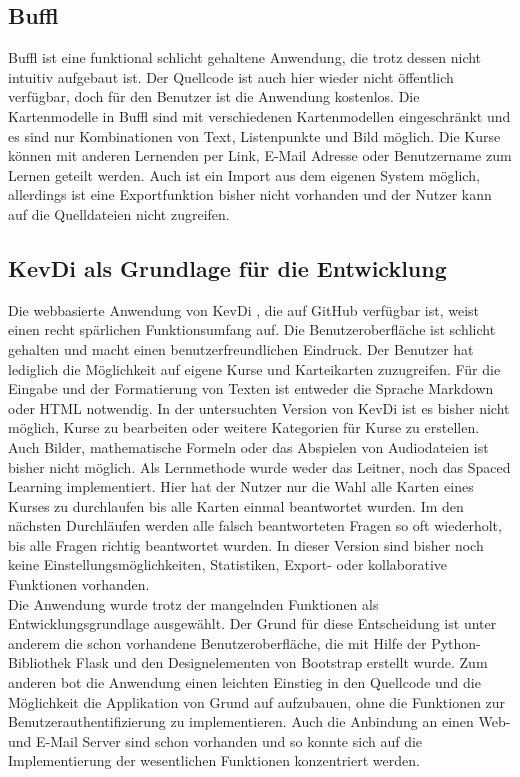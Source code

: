 \subsection{Buffl}
Buffl \cite{buffl} ist eine funktional schlicht gehaltene Anwendung, die trotz dessen nicht intuitiv aufgebaut ist. Der Quellcode ist auch hier wieder nicht öffentlich verfügbar, doch für den Benutzer ist die Anwendung kostenlos. Die Kartenmodelle in Buffl sind mit verschiedenen Kartenmodellen eingeschränkt und es sind nur Kombinationen von Text, Listenpunkte und Bild möglich. Die Kurse können mit anderen Lernenden per Link, E-Mail Adresse oder Benutzername zum Lernen geteilt werden. Auch ist ein Import aus dem eigenen System möglich, allerdings ist eine Exportfunktion bisher nicht vorhanden und der Nutzer kann auf die Quelldateien nicht zugreifen. \


\subsection{KevDi als Grundlage für die Entwicklung}
Die webbasierte Anwendung von KevDi \cite{kevdi}, die auf GitHub verfügbar ist, weist einen recht spärlichen Funktionsumfang auf. Die Benutzeroberfläche ist schlicht gehalten und macht einen benutzerfreundlichen Eindruck. Der Benutzer hat lediglich die Möglichkeit auf eigene Kurse und Karteikarten zuzugreifen. Für die Eingabe und der Formatierung von Texten ist entweder die Sprache Markdown oder HTML notwendig. In der untersuchten Version von KevDi ist es bisher nicht möglich, Kurse zu bearbeiten oder weitere Kategorien für Kurse zu erstellen. Auch Bilder, mathematische Formeln oder das Abspielen von Audiodateien ist bisher nicht möglich. Als Lernmethode wurde weder das Leitner, noch das Spaced Learning implementiert. Hier hat der Nutzer nur die Wahl alle Karten eines Kurses zu durchlaufen bis alle Karten einmal beantwortet wurden. Im den nächsten Durchläufen werden alle falsch beantworteten Fragen so oft wiederholt, bis alle Fragen richtig beantwortet wurden. In dieser Version sind bisher noch keine Einstellungsmöglichkeiten, Statistiken, Export- oder kollaborative Funktionen vorhanden. \\

Die Anwendung wurde trotz der mangelnden Funktionen als Entwicklungsgrundlage ausgewählt. Der Grund für diese Entscheidung ist unter anderem die schon vorhandene Benutzeroberfläche, die mit Hilfe der Python-Bibliothek Flask und den Designelementen von Bootstrap erstellt wurde. Zum anderen bot die Anwendung einen leichten Einstieg in den Quellcode und die Möglichkeit die Applikation von Grund auf aufzubauen, ohne die Funktionen zur Benutzerauthentifizierung zu implementieren. Auch die Anbindung an einen Web- und E-Mail Server sind schon vorhanden und so konnte sich auf die Implementierung der wesentlichen Funktionen konzentriert werden. \\



